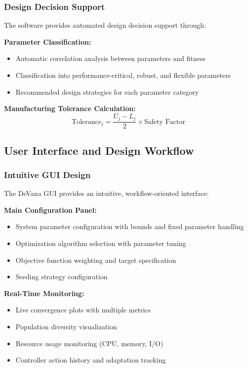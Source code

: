 \documentclass[12pt,a4paper]{article}
\newcommand{\softwareName}{DeVana}
\begin{document}
\subsubsection{Design Decision Support}

The software provides automated design decision support through:

\textbf{Parameter Classification:}
\begin{itemize}
    \item Automatic correlation analysis between parameters and fitness
    \item Classification into performance-critical, robust, and flexible parameters
    \item Recommended design strategies for each parameter category
\end{itemize}

\textbf{Manufacturing Tolerance Calculation:}
\begin{equation}
\text{Tolerance}_j = \frac{U_j - L_j}{2} \times \text{Safety Factor}
\end{equation}

\subsection{User Interface and Design Workflow}

\subsubsection{Intuitive GUI Design}

The \softwareName{} GUI provides an intuitive, workflow-oriented interface:

\textbf{Main Configuration Panel:}
\begin{itemize}
    \item System parameter configuration with bounds and fixed parameter handling
    \item Optimization algorithm selection with parameter tuning
    \item Objective function weighting and target specification
    \item Seeding strategy configuration
\end{itemize}

\textbf{Real-Time Monitoring:}
\begin{itemize}
    \item Live convergence plots with multiple metrics
    \item Population diversity visualization
    \item Resource usage monitoring (CPU, memory, I/O)
    \item Controller action history and adaptation tracking
\end{itemize}
\end{document}
